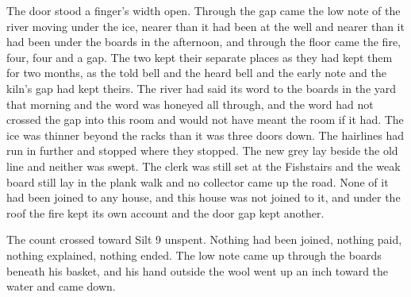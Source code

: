 The door stood a finger's width open. Through the gap came the low note of the river moving under the ice, nearer than it had been at the well and nearer than it had been under the boards in the afternoon, and through the floor came the fire, four, four and a gap. The two kept their separate places as they had kept them for two months, as the told bell and the heard bell and the early note and the kiln's gap had kept theirs. The river had said its word to the boards in the yard that morning and the word was honeyed all through, and the word had not crossed the gap into this room and would not have meant the room if it had. The ice was thinner beyond the racks than it was three doors down. The hairlines had run in further and stopped where they stopped. The new grey lay beside the old line and neither was swept. The clerk was still set at the Fishstairs and the weak board still lay in the plank walk and no collector came up the road. None of it had been joined to any house, and this house was not joined to it, and under the roof the fire kept its own account and the door gap kept another.

The count crossed toward Silt 9 unspent. Nothing had been joined, nothing paid, nothing explained, nothing ended. The low note came up through the boards beneath his basket, and his hand outside the wool went up an inch toward the water and came down.
